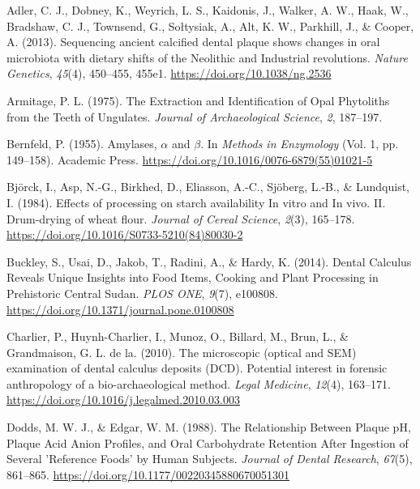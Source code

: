 \documentclass[
  b5paper,
]{book}
\newlength{\cslhangindent}
\newlength{\cslentryspacingunit} %
\newenvironment{CSLReferences}[2] %
 {%
  \setlength{\parindent}{0pt}
  \ifodd #1
  \let\oldpar\par
  \def\par{\hangindent=\cslhangindent\oldpar}
  \fi
  \setlength{\parskip}{#2\cslentryspacingunit}
 }%
 {}
\begin{document}
\hypertarget{refs-4}{}
\begin{CSLReferences}{1}{0}
\leavevmode{}%
Adler, C. J., Dobney, K., Weyrich, L. S., Kaidonis, J., Walker, A. W.,
Haak, W., Bradshaw, C. J., Townsend, G., Sołtysiak, A., Alt, K. W.,
Parkhill, J., \& Cooper, A. (2013). Sequencing ancient calcified dental
plaque shows changes in oral microbiota with dietary shifts of the
{Neolithic} and {Industrial} revolutions. \emph{Nature Genetics},
\emph{45}(4), 450--455, 455e1. \url{https://doi.org/10.1038/ng.2536}

\leavevmode{}%
Armitage, P. L. (1975). The {Extraction} and {Identification} of {Opal
Phytoliths} from the {Teeth} of {Ungulates}. \emph{Journal of
Archaeological Science}, \emph{2}, 187--197.

\leavevmode{}%
Bernfeld, P. (1955). Amylases, {\(\alpha\)} and {\(\beta\)}. In
\emph{Methods in {Enzymology}} (Vol. 1, pp. 149--158). {Academic Press}.
\url{https://doi.org/10.1016/0076-6879(55)01021-5}

\leavevmode{}%
Björck, I., Asp, N.-G., Birkhed, D., Eliasson, A.-C., Sjöberg, L.-B., \&
Lundquist, I. (1984). Effects of processing on starch availability {In}
vitro and {In} vivo. {II}. {Drum-drying} of wheat flour. \emph{Journal
of Cereal Science}, \emph{2}(3), 165--178.
\url{https://doi.org/10.1016/S0733-5210(84)80030-2}

\leavevmode{}%
Buckley, S., Usai, D., Jakob, T., Radini, A., \& Hardy, K. (2014).
Dental {Calculus Reveals Unique Insights} into {Food Items}, {Cooking}
and {Plant Processing} in {Prehistoric Central Sudan}. \emph{PLOS ONE},
\emph{9}(7), e100808. \url{https://doi.org/10.1371/journal.pone.0100808}

\leavevmode{}%
Charlier, P., Huynh-Charlier, I., Munoz, O., Billard, M., Brun, L., \&
Grandmaison, G. L. de la. (2010). The microscopic (optical and {SEM})
examination of dental calculus deposits ({DCD}). {Potential} interest in
forensic anthropology of a bio-archaeological method. \emph{Legal
Medicine}, \emph{12}(4), 163--171.
\url{https://doi.org/10.1016/j.legalmed.2010.03.003}

\leavevmode{}%
Dodds, M. W. J., \& Edgar, W. M. (1988). The {Relationship Between
Plaque pH}, {Plaque Acid Anion Profiles}, and {Oral Carbohydrate
Retention After Ingestion} of {Several} '{Reference Foods}' by {Human
Subjects}. \emph{Journal of Dental Research}, \emph{67}(5), 861--865.
\url{https://doi.org/10.1177/00220345880670051301}


\end{CSLReferences}
\end{document}
